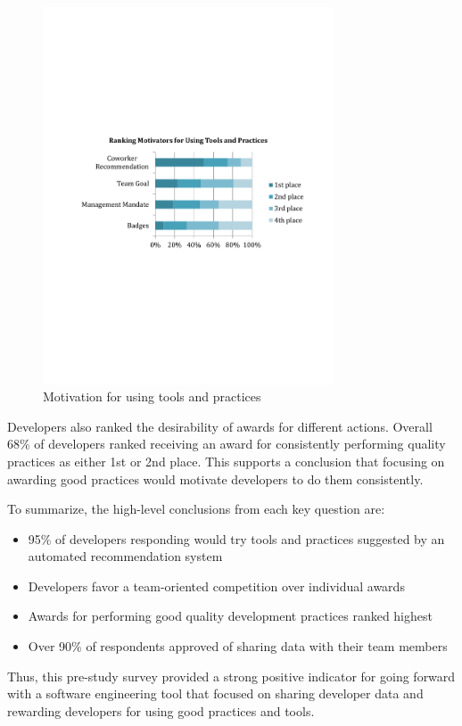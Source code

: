 \documentclass{sig-alternate}
\begin{document}
\begin{figure}
	\includegraphics[width=3.4in]{ToolAndPracticeMotivators.pdf}
	\caption{Motivation for using tools and practices}
	\label{fig:toolandpracticemotivators}
\end{figure}

Developers also ranked the desirability of awards for different actions.  Overall 68\% of developers ranked receiving an award for consistently performing quality practices as either 1st or 2nd place.  This supports a conclusion that focusing on awarding good practices would motivate developers to do them consistently.

 To summarize, the high-level conclusions from each key question are:
\begin{itemize}[itemsep=0mm]
\item 95\% of developers responding would try tools and practices suggested by an automated recommendation system 
\item Developers favor a team-oriented competition over individual awards
\item Awards for performing good quality development practices ranked highest
\item Over 90\% of respondents approved of sharing data with their team members
\end{itemize}
Thus, this pre-study survey provided a strong positive indicator for going forward with a software engineering tool that focused on sharing developer data and rewarding developers for using good practices and tools. 
\end{document}
